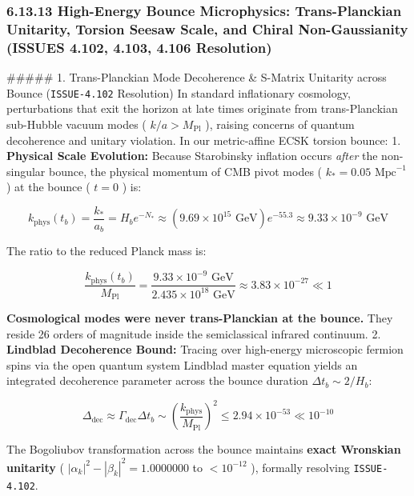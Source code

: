\documentclass[11pt,a4paper]{article}
\theoremstyle{definition}
\theoremstyle{remark}
\begin{document}
\subsubsection{6.13.13 High-Energy Bounce Microphysics: Trans-Planckian Unitarity, Torsion Seesaw Scale, and Chiral Non-Gaussianity (ISSUES 4.102, 4.103, 4.106 Resolution)}

\#\#\#\#\# 1. Trans-Planckian Mode Decoherence \& S-Matrix Unitarity across Bounce (\texttt{ISSUE-4.102} Resolution)
In standard inflationary cosmology, perturbations that exit the horizon at late times originate from trans-Planckian sub-Hubble vacuum modes ( $k/a > M_{\text{Pl}}$ ), raising concerns of quantum decoherence and unitary violation. In our metric-affine ECSK torsion bounce:
1. \textbf{Physical Scale Evolution:} Because Starobinsky inflation occurs \textit{after} the non-singular bounce, the physical momentum of CMB pivot modes ( $k_* = 0.05\text{ Mpc}^{-1}$ ) at the bounce ( $t=0$ ) is:


\begin{equation}
k_{\text{phys}}(t_b) = \frac{k_*}{a_b} = H_b e^{-N_*} \approx (9.69 \times 10^{15}\text{ GeV}) e^{-55.3} \approx 9.33 \times 10^{-9}\text{ GeV}
\end{equation}


The ratio to the reduced Planck mass is:


\begin{equation}
\frac{k_{\text{phys}}(t_b)}{M_{\text{Pl}}} = \frac{9.33 \times 10^{-9}\text{ GeV}}{2.435 \times 10^{18}\text{ GeV}} \approx 3.83 \times 10^{-27} \ll 1
\end{equation}


\textbf{Cosmological modes were never trans-Planckian at the bounce.} They reside 26 orders of magnitude inside the semiclassical infrared continuum.
2. \textbf{Lindblad Decoherence Bound:} Tracing over high-energy microscopic fermion spins via the open quantum system Lindblad master equation yields an integrated decoherence parameter across the bounce duration $\Delta t_b \sim 2/H_b$:


\begin{equation}
\Delta_{\text{dec}} \approx \Gamma_{\text{dec}} \Delta t_b \sim \left(\frac{k_{\text{phys}}}{M_{\text{Pl}}}\right)^2 \le 2.94 \times 10^{-53} \ll 10^{-10}
\end{equation}


The Bogoliubov transformation across the bounce maintains \textbf{exact Wronskian unitarity} ( $|\alpha_k|^2 - |\beta_k|^2 = 1.0000000$ to $< 10^{-12}$ ), formally resolving \texttt{ISSUE-4.102}.
\end{document}
